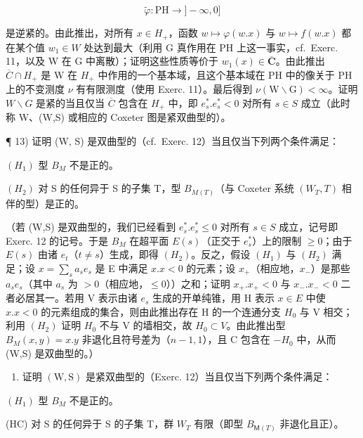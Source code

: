 \[
\left. \tilde {\varphi}: \mathrm{PH} \rightarrow ] - \infty , 0 ] \right.
\]

是逆紧的。由此推出，对所有 \(x \in H_{+}\)，函数 \(w \mapsto \varphi(w.x)\) 与 \(w \mapsto f(w.x)\) 都在某个值 \(w_{1} \in W\) 处达到最大（利用 G 真作用在 PH 上这一事实，cf.~Exerc. 11，以及 W 在 G 中离散）；证明这些性质等价于 \(w_{1}(x) \in \overline{\mathbf{C}}\)。由此推出 \(\overline{C} \cap H_{+}\) 是 W 在 \(H_{+}\) 中作用的一个基本域，且这个基本域在 PH 中的像关于 PH 上的不变测度 \(\nu\) 有有限测度（使用 Exerc. 11）。最后得到 \(\nu(\mathrm{W} \backslash \mathrm{G}) < \infty\)。证明 \(W \backslash G\) 是紧的当且仅当 \(\overline{C}\) 包含在 \(H_{+}\) 中，即 \(e_{s}^{*}.e_{s}^{*} < 0\) 对所有 \(s \in S\) 成立（此时称 W、(W,S) 或相应的 Coxeter 图是紧双曲型的）。

¶ 13) 证明 (W, S) 是双曲型的（cf.~Exerc. 12）当且仅当下列两个条件满足：

\((H_{1})\) 型 \(B_{M}\) 不是正的。

\((H_{2})\) 对 S 的任何异于 S 的子集 T，型 \(B_{M(T)}\)（与 Coxeter 系统 \((W_{T}, T)\) 相伴的型）是正的。

（若 (W,S) 是双曲型的，我们已经看到 \(e_s^*.e_s^* \leqslant 0\) 对所有 \(s \in S\) 成立，记号即 Exerc. 12 的记号。于是 \(B_M\) 在超平面 \(E(s)\)（正交于 \(e_s^*\)）上的限制 \(\geqslant 0\)；由于 \(E(s)\) 由诸 \(e_t\)（\(t \neq s\)）生成，即得 \((H_2)\)。反之，假设 \((H_1)\) 与 \((H_2)\) 满足；设 \(x = \sum_{s} a_s e_s\) 是 E 中满足 \(x.x < 0\) 的元素；设 \(x_+\)（相应地，\(x_-\)）是那些 \(a_s e_s\)（其中 \(a_s\) 为 \(> 0\)（相应地，\(\leqslant 0\)））之和；证明 \(x_+.x_+ < 0\) 与 \(x_-.x_- < 0\) 二者必居其一。若用 V 表示由诸 \(e_s\) 生成的开单纯锥，用 H 表示 \(x \in E\) 中使 \(x.x < 0\) 的元素组成的集合，则由此推出存在 H 的一个连通分支 \(H_0\) 与 V 相交；利用 \((H_2)\) 证明 \(H_0\) 不与 V 的墙相交，故 \(H_0 \subset V\)。由此推出型 \(B_M(x,y) = x.y\) 非退化且符号差为（\(n-1,1\)），且 C 包含在 \(-H_0\) 中，从而 (W,S) 是双曲型的。）

\begin{enumerate}
\def\labelenumi{\arabic{enumi})}
\setcounter{enumi}{13}
\tightlist
\item
  证明 \((\mathrm{W},\mathrm{S})\) 是紧双曲型的（Exerc. 12）当且仅当下列两个条件满足：
\end{enumerate}

\((H_{1})\) 型 \(B_{M}\) 不是正的。

(HC) 对 S 的任何异于 S 的子集 T，群 \(W_{T}\) 有限（即型 \(B_{\mathsf{M}(T)}\) 非退化且正）。

